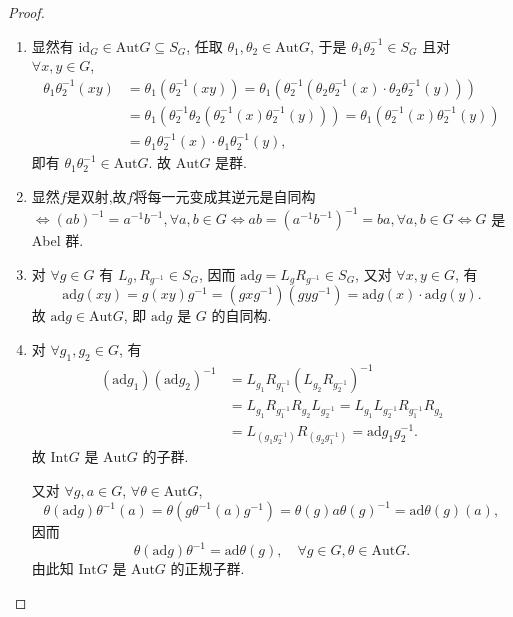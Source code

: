 \documentclass[../../main.tex]{subfiles}%
\begin{document}
\begin{proof}
\begin{enumerate}[(1)]
\item 显然有 \( \text{id}_G \in \text{Aut}G \subseteq S_G \), 任取 \( \theta_1, \theta_2 \in \text{Aut}G \), 于是 \( \theta_1\theta_2^{-1} \in S_G \) 且对 \( \forall x,y \in G \),
\begin{align*}
\theta_1\theta_2^{-1}(xy) &= \theta_1(\theta_2^{-1}(xy)) = \theta_1(\theta_2^{-1}(\theta_2\theta_2^{-1}(x) \cdot \theta_2\theta_2^{-1}(y))) \\
&= \theta_1(\theta_2^{-1}\theta_2(\theta_2^{-1}(x)\theta_2^{-1}(y))) = \theta_1(\theta_2^{-1}(x)\theta_2^{-1}(y)) \\
&= \theta_1\theta_2^{-1}(x) \cdot \theta_1\theta_2^{-1}(y),
\end{align*}
即有 \( \theta_1\theta_2^{-1} \in \text{Aut}G \). 故 \( \text{Aut}G \) 是群.

\item 显然$f$是双射,故$f$将每一元变成其逆元是自同构 $\iff (ab)^{-1}=a^{-1}b^{-1},\forall a,b\in G \iff ab=(a^{-1}b^{-1})^{-1}=ba,\forall a,b\in G \iff G$ 是 Abel 群.

\item 对 \( \forall g \in G \) 有 \( L_g, R_{g^{-1}} \in S_G \), 因而 \( \text{ad}g = L_gR_{g^{-1}} \in S_G \), 又对 \( \forall x,y \in G \), 有
\[
\text{ad}g(xy) = g(xy)g^{-1} = (gxg^{-1})(gyg^{-1}) = \text{ad}g(x) \cdot \text{ad}g(y).
\]
故 \( \text{ad}g \in \text{Aut}G \), 即 \( \text{ad}g \) 是 \( G \) 的自同构.

\item 对 \( \forall g_1,g_2 \in G \), 有
\begin{align}
(\text{ad}g_1)(\text{ad}g_2)^{-1} &= L_{g_1}R_{g_1^{-1}}(L_{g_2}R_{g_2^{-1}})^{-1} \nonumber \\
&= L_{g_1}R_{g_1^{-1}}R_{g_2}L_{g_2^{-1}} = L_{g_1}L_{g_2^{-1}}R_{g_1^{-1}}R_{g_2} \nonumber \\
&= L_{(g_1g_2^{-1})}R_{(g_2g_1^{-1})} = \text{ad}g_1g_2^{-1}. \label{eq:1.5.1}
\end{align}
故 \( \text{Int}G \) 是 \( \text{Aut}G \) 的子群.

又对 \( \forall g,a \in G \), \( \forall \theta \in \text{Aut}G \),
\[
\theta(\text{ad}g)\theta^{-1}(a) = \theta(g\theta^{-1}(a)g^{-1}) = \theta(g)a\theta(g)^{-1} = \text{ad}\theta(g)(a),
\]
因而
\[
\theta(\text{ad}g)\theta^{-1} = \text{ad}\theta(g), \quad \forall g \in G, \theta \in \text{Aut}G. \label{eq:1.5.2}
\]
由此知 \( \text{Int}G \) 是 \( \text{Aut}G \) 的正规子群.


\end{enumerate}
\end{proof}
\end{document}

